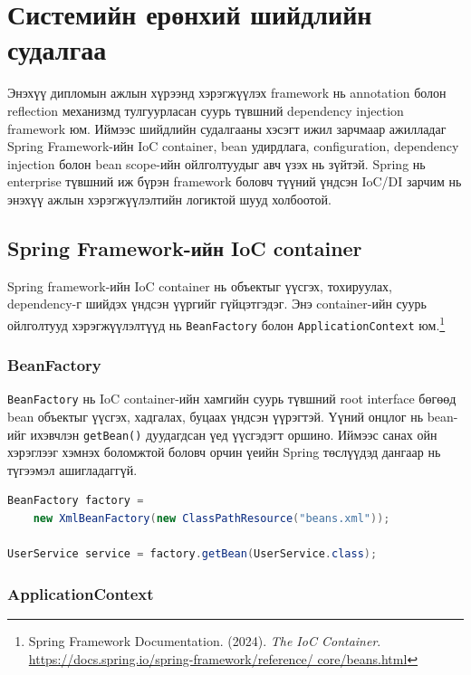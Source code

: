 \newpage
\section{Системийн ерөнхий шийдлийн судалгаа}

Энэхүү дипломын ажлын хүрээнд хэрэгжүүлэх framework нь annotation болон reflection механизмд тулгуурласан суурь түвшний dependency injection framework юм. Иймээс шийдлийн судалгааны хэсэгт ижил зарчмаар ажилладаг Spring Framework-ийн IoC container, bean удирдлага, configuration, dependency injection болон bean scope-ийн ойлголтуудыг авч үзэх нь зүйтэй. Spring нь enterprise түвшний иж бүрэн framework боловч түүний үндсэн IoC/DI зарчим нь энэхүү ажлын хэрэгжүүлэлтийн логиктой шууд холбоотой.

\subsection{Spring Framework-ийн IoC container}

Spring framework-ийн IoC container нь объектыг үүсгэх, тохируулах, dependency-г шийдэх үндсэн үүргийг гүйцэтгэдэг. Энэ container-ийн суурь ойлголтууд хэрэгжүүлэлтүүд нь \texttt{BeanFactory} болон \texttt{ApplicationContext} юм.\footnote{Spring Framework Documentation.
(2024). \textit{The IoC Container}.
\url{https://docs.spring.io/spring-framework/reference/
core/beans.html}}

\subsubsection{BeanFactory}

\texttt{BeanFactory} нь IoC container-ийн хамгийн суурь түвшний root interface бөгөөд bean объектыг үүсгэх, хадгалах, буцаах үндсэн үүрэгтэй. Үүний онцлог нь bean-ийг ихэвчлэн \texttt{getBean()} дуудагдсан үед үүсгэдэгт оршино. Иймээс санах ойн хэрэглээг хэмнэх боломжтой боловч орчин үеийн Spring төслүүдэд дангаар нь түгээмэл ашигладаггүй.

\begin{lstlisting}[language=Java, style=mystyle, caption={BeanFactory ашигласан жишээ}, label={lst:beanfactory-example}]
BeanFactory factory =
    new XmlBeanFactory(new ClassPathResource("beans.xml"));

UserService service = factory.getBean(UserService.class);
\end{lstlisting}

\subsubsection{ApplicationContext}

